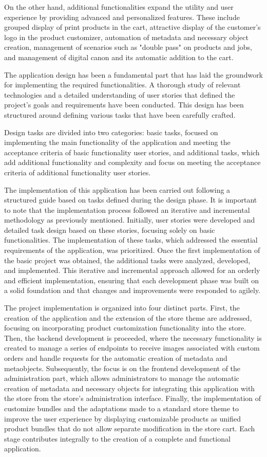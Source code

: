 \documentclass[12pt]{article}
\begin{document}
On the other hand, additional functionalities expand the utility and user experience by providing advanced and personalized features. 
These include grouped display of print products in the cart, attractive display of the customer's logo in the product customizer, 
automation of metadata and necessary object creation, management of scenarios such as "double pass" on products and jobs, and management
of digital canon and its automatic addition to the cart.

The application design has been a fundamental part that has laid the groundwork for implementing the required functionalities. 
A thorough study of relevant technologies and a detailed understanding of user stories that defined the project's goals 
and requirements have been conducted. This design has been structured around defining various tasks that have been carefully crafted.

Design tasks are divided into two categories: basic tasks, focused on implementing the main functionality of the application and meeting
the acceptance criteria of basic functionality user stories, and additional tasks, which add additional functionality and complexity 
and focus on meeting the acceptance criteria of additional functionality user stories.

The implementation of this application has been carried out following a structured guide based on tasks defined during the design phase.
It is important to note that the implementation process followed an iterative and incremental methodology as previously mentioned. Initially,
user stories were developed and detailed task design based on these stories, focusing solely on basic functionalities. 
The implementation of these tasks, which addressed the essential requirements of the application, was prioritized. 
Once the first implementation of the basic project was obtained, the additional tasks were analyzed, developed, and implemented.
This iterative and incremental approach allowed for an orderly and efficient implementation, ensuring that each development 
phase was built on a solid foundation and that changes and improvements were responded to agilely.

The project implementation is organized into four distinct parts. First, the creation of the application and the extension 
of the store theme are addressed, focusing on incorporating product customization functionality into the store. Then, 
the backend development is proceeded, where the necessary functionality is created to manage a series of endpoints to receive 
images associated with custom orders and handle requests for the automatic creation of metadata and metaobjects. Subsequently, 
the focus is on the frontend development of the administration part, which allows administrators to manage the automatic creation 
of metadata and necessary objects for integrating this application with the store from the store's administration interface. 
Finally, the implementation of customize bundles and the adaptations made to a standard store theme to improve the user experience 
by displaying customizable products as unified product bundles that do not allow separate modification in the store cart. Each stage
contributes integrally to the creation of a complete and functional application.
\end{document}
